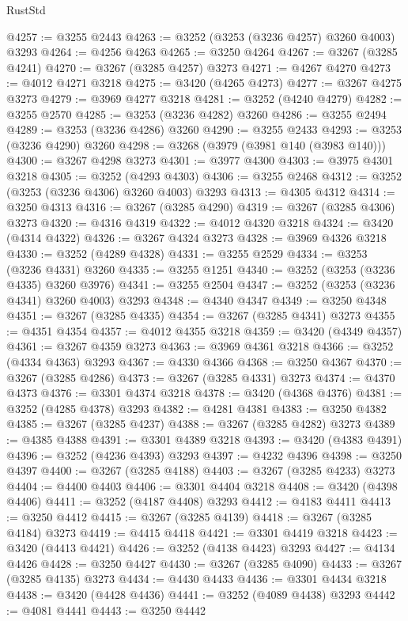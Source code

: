 \begin{lexlean}{RustStd}
\begin{coremodule}
@4257 := @3255 @2443
@4263 := @3252 (@3253 (@3236 @4257) @3260 @4003) @3293
@4264 := @4256 @4263
@4265 := @3250 @4264
@4267 := @3267 (@3285 @4241)
@4270 := @3267 (@3285 @4257) @3273
@4271 := @4267 @4270
@4273 := @4012 @4271 @3218
@4275 := @3420 (@4265 @4273)
@4277 := @3267 @4275 @3273
@4279 := @3969 @4277 @3218
@4281 := @3252 (@4240 @4279)
@4282 := @3255 @2570
@4285 := @3253 (@3236 @4282) @3260
@4286 := @3255 @2494
@4289 := @3253 (@3236 @4286) @3260
@4290 := @3255 @2433
@4293 := @3253 (@3236 @4290) @3260
@4298 := @3268 (@3979 (@3981 @140 (@3983 @140)))
@4300 := @3267 @4298 @3273
@4301 := @3977 @4300
@4303 := @3975 @4301 @3218
@4305 := @3252 (@4293 @4303)
@4306 := @3255 @2468
@4312 := @3252 (@3253 (@3236 @4306) @3260 @4003) @3293
@4313 := @4305 @4312
@4314 := @3250 @4313
@4316 := @3267 (@3285 @4290)
@4319 := @3267 (@3285 @4306) @3273
@4320 := @4316 @4319
@4322 := @4012 @4320 @3218
@4324 := @3420 (@4314 @4322)
@4326 := @3267 @4324 @3273
@4328 := @3969 @4326 @3218
@4330 := @3252 (@4289 @4328)
@4331 := @3255 @2529
@4334 := @3253 (@3236 @4331) @3260
@4335 := @3255 @1251
@4340 := @3252 (@3253 (@3236 @4335) @3260 @3976)
@4341 := @3255 @2504
@4347 := @3252 (@3253 (@3236 @4341) @3260 @4003) @3293
@4348 := @4340 @4347
@4349 := @3250 @4348
@4351 := @3267 (@3285 @4335)
@4354 := @3267 (@3285 @4341) @3273
@4355 := @4351 @4354
@4357 := @4012 @4355 @3218
@4359 := @3420 (@4349 @4357)
@4361 := @3267 @4359 @3273
@4363 := @3969 @4361 @3218
@4366 := @3252 (@4334 @4363) @3293
@4367 := @4330 @4366
@4368 := @3250 @4367
@4370 := @3267 (@3285 @4286)
@4373 := @3267 (@3285 @4331) @3273
@4374 := @4370 @4373
@4376 := @3301 @4374 @3218
@4378 := @3420 (@4368 @4376)
@4381 := @3252 (@4285 @4378) @3293
@4382 := @4281 @4381
@4383 := @3250 @4382
@4385 := @3267 (@3285 @4237)
@4388 := @3267 (@3285 @4282) @3273
@4389 := @4385 @4388
@4391 := @3301 @4389 @3218
@4393 := @3420 (@4383 @4391)
@4396 := @3252 (@4236 @4393) @3293
@4397 := @4232 @4396
@4398 := @3250 @4397
@4400 := @3267 (@3285 @4188)
@4403 := @3267 (@3285 @4233) @3273
@4404 := @4400 @4403
@4406 := @3301 @4404 @3218
@4408 := @3420 (@4398 @4406)
@4411 := @3252 (@4187 @4408) @3293
@4412 := @4183 @4411
@4413 := @3250 @4412
@4415 := @3267 (@3285 @4139)
@4418 := @3267 (@3285 @4184) @3273
@4419 := @4415 @4418
@4421 := @3301 @4419 @3218
@4423 := @3420 (@4413 @4421)
@4426 := @3252 (@4138 @4423) @3293
@4427 := @4134 @4426
@4428 := @3250 @4427
@4430 := @3267 (@3285 @4090)
@4433 := @3267 (@3285 @4135) @3273
@4434 := @4430 @4433
@4436 := @3301 @4434 @3218
@4438 := @3420 (@4428 @4436)
@4441 := @3252 (@4089 @4438) @3293
@4442 := @4081 @4441
@4443 := @3250 @4442

\end{coremodule}
\end{lexlean}
